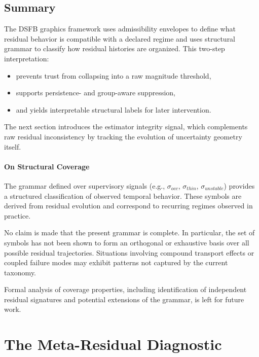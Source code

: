 \documentclass[11pt,letterpaper]{article}
\theoremstyle{gcresult}
\theoremstyle{definition}
\begin{document}

\subsection{Summary}

The DSFB graphics framework uses admissibility envelopes to define what residual behavior is compatible with a declared regime and uses structural grammar to classify how residual histories are organized. This two-step interpretation:
\begin{itemize}[leftmargin=1.5em]
    \item prevents trust from collapsing into a raw magnitude threshold,
    \item supports persistence- and group-aware suppression,
    \item and yields interpretable structural labels for later intervention.
\end{itemize}

The next section introduces the estimator integrity signal, which complements raw residual inconsistency by tracking the evolution of uncertainty geometry itself.


\paragraph{On Structural Coverage}

The grammar defined over supervisory signals (e.g., $\sigma_{occ}$, $\sigma_{thin}$, $\sigma_{unstable}$) provides a structured classification of observed temporal behavior. These symbols are derived from residual evolution and correspond to recurring regimes observed in practice.

No claim is made that the present grammar is complete. In particular, the set of symbols has not been shown to form an orthogonal or exhaustive basis over all possible residual trajectories. Situations involving compound transport effects or coupled failure modes may exhibit patterns not captured by the current taxonomy.

Formal analysis of coverage properties, including identification of independent residual signatures and potential extensions of the grammar, is left for future work.


\section{The Meta-Residual Diagnostic}
\end{document}
